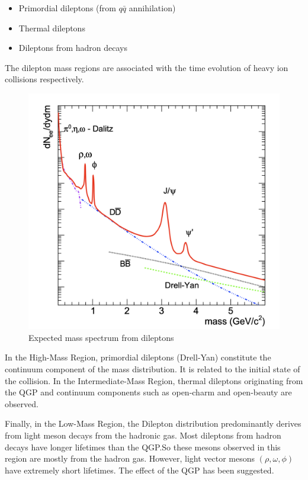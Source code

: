         \begin{itemize}
            \item Primordial dileptons (from \(q\bar{q}\) annihilation)
            \item Thermal dileptons
            \item Dileptons from hadron decays
        \end{itemize} 
        The dilepton mass regions are associated with the time evolution of heavy ion collisions respectively.
        \begin{figure}[hbtp]
            \centering
            \includegraphics[keepaspectratio, scale=0.3]{fig/1_6_expected_dileptonMass.png}
            \caption{Expected mass spectrum from dileptons\cite{Rapp:1999ej}}
            \label{Intro:Dilepton:dilepton_mass}
        \end{figure}      
        In the High-Mass Region, primordial dileptons (Drell-Yan) constitute the continuum component of the mass distribution. It is related to the initial state of the collision. In the Intermediate-Mass Region, thermal dileptons originating from the QGP and continuum components such as open-charm and open-beauty are observed. 
        
        Finally, in the Low-Mass Region, the Dilepton distribution predominantly derives from light meson decays from the hadronic gas. Most dileptons from hadron decays have longer lifetimes than the QGP.\@ So these mesons observed in this region are mostly from the hadron gas. However, light vector mesons $(\rho, \omega, \phi)$ have extremely short lifetimes. The effect of the QGP has been suggested.\@
